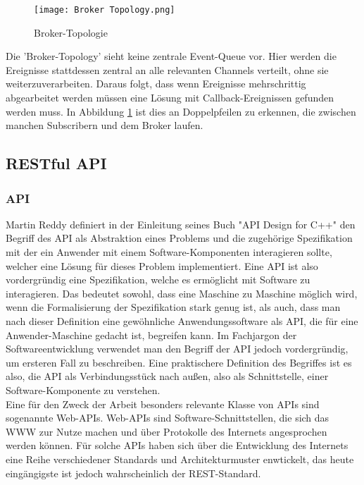 \begin{figure}[H]
  \centering
  \texttt{[image: Broker Topology.png]}
  \caption[Broker-Topologie]{Broker-Topologie \footnotemark}
  \label{brokertop}
\end{figure}
Die 'Broker-Topology' sieht keine zentrale Event-Queue vor. Hier werden die Ereignisse stattdessen zentral an alle relevanten Channels verteilt, ohne sie weiterzuverarbeiten. Daraus folgt, dass wenn Ereignisse mehrschrittig abgearbeitet werden müssen eine Lösung mit Callback-Ereignissen gefunden werden muss. In Abbildung \ref{brokertop} ist dies an Doppelpfeilen zu erkennen, die zwischen manchen Subscribern und dem Broker laufen. \cite[Vgl. ][]{wickramarachchi_2017_event}

\subsection{RESTful API}
\subsubsection*{API}
Martin Reddy definiert in der Einleitung seines Buch "API Design for C++" den Begriff des \ac{API} als Abstraktion eines Problems und die zugehörige Spezifikation mit der ein Anwender mit einem Software-Komponenten interagieren sollte, welcher eine Lösung für dieses Problem implementiert. \cite[Vgl. ][S. 1]{reddy2011api} Eine API ist also vordergründig eine Spezifikation, welche es ermöglicht mit Software zu interagieren. Das bedeutet sowohl, dass eine Maschine zu Maschine möglich wird, wenn die Formalisierung der Spezifikation stark genug ist, als auch, dass man nach dieser Definition eine gewöhnliche Anwendungssoftware als API, die für eine Anwender-Maschine gedacht ist, begreifen kann. Im Fachjargon der Softwareentwicklung verwendet man den Begriff der \ac{API} jedoch vordergründig, um ersteren Fall zu beschreiben. Eine praktischere Definition des Begriffes ist es also, die API als Verbindungsstück nach außen, also als Schnittstelle, einer Software-Komponente zu verstehen. \\
Eine für den Zweck der Arbeit besonders relevante Klasse von \ac{API}s sind sogenannte Web-\ac{API}s. Web-\ac{API}s sind Software-Schnittstellen, die sich das \ac{WWW} zur Nutze machen und über Protokolle des Internets angesprochen werden können. Für solche \ac{API}s haben sich über die Entwicklung des Internets eine Reihe verschiedener Standards und Architekturmuster enwtickelt, das heute eingängigste ist jedoch wahrscheinlich der REST-Standard. \cite[Vgl. ][S.5f]{richardson2007web}

